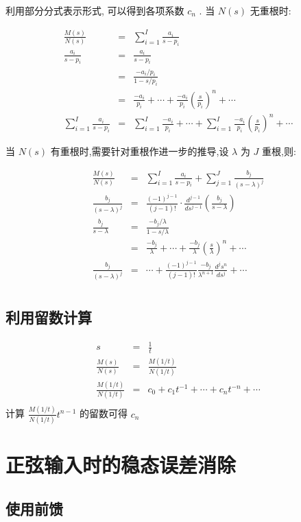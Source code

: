 \documentclass{article}
\begin{document}
利用部分分式表示形式, 可以得到各项系数 $c_n$ . 当 $N(s)$ 无重根时:

\begin{eqnarray}
\frac{M(s)}{N(s)} &=& \sum_{i=1}^I \frac{a_i}{s-p_i} \\
\frac{a_i}{s-p_i} &=& \frac{a_i}{s-p_i} \\
                  &=& \frac{-a_i/p_i}{1-s/p_i} \\
                  &=& \frac{-a_i}{p_i}+\cdots+\frac{-a_i}{p_i}(\frac{s}{p_i})^n+\cdots \\
\sum_{i=1}^I \frac{a_i}{s-p_i} &=& \sum_{i=1}^I \frac{-a_i}{p_i}+\cdots+\sum_{i=1}^I \frac{-a_i}{p_i}(\frac{s}{p_i})^n+\cdots 
\end{eqnarray}

当 $N(s)$ 有重根时,需要针对重根作进一步的推导,设 $\lambda$ 为 $J$ 重根,则:

\begin{eqnarray}
\frac{M(s)}{N(s)} &=& \sum_{i=1}^I \frac{a_i}{s-p_i}+\sum_{j=1}^{J}\frac{b_j}{(s-\lambda)^j} \\
\frac{b_j}{(s-\lambda)^j} &=& \frac{(-1)^{j-1}}{(j-1)!}\cdot\frac{d^{j-1}}{ds^{j-1}}(\frac{b_j}{s-\lambda}) \\
\frac{b_j}{s-\lambda} &=& \frac{-b_j/\lambda}{1-s/\lambda} \\
                  &=& \frac{-b_j}{\lambda}+\cdots+\frac{-b_j}{\lambda}(\frac{s}{\lambda})^n+\cdots \\
\frac{b_j}{(s-\lambda)^j} &=& \cdots+\frac{(-1)^{j-1}}{(j-1)!}\frac{-b_j}{\lambda^{n+1}}\frac{d^js^n}{ds^j}+\cdots \\
\end{eqnarray}
\subsection{利用留数计算}
\label{sec-4-2}

\begin{eqnarray*}
s &=&\frac{1}{t} \\
\frac{M(s)}{N(s)}&=&\frac{M(1/t)}{N(1/t)}\\
\frac{M(1/t)}{N(1/t)} &=& c_0+c_1t^{-1}+\cdots+c_nt^{-n}+\cdots \\
\end{eqnarray*}
计算 $\frac{M(1/t)}{N(1/t)}t^{n-1}$ 的留数可得 $c_n$
\section{正弦输入时的稳态误差消除}
\label{sec-5}
\subsection{使用前馈}
\label{sec-5-1}
\end{document}
